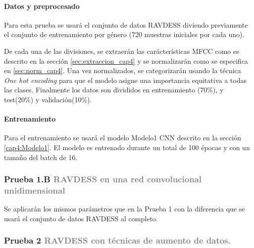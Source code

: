 \documentclass[11pt,a4paper,spanish]{book}
\begin{document}
	\hfill\begin{minipage}{\dimexpr\textwidth-1cm}
		\paragraph{Datos y preprocesado}
		Para esta prueba se usará el conjunto de datos RAVDESS diviendo previamente el conjunto de entrenamiento por género (720 muestras iniciales por cada uno). 
		
		De cada una de las divisiones, se extraerán las carácterísticas MFCC como es descrito en la sección \ref{sec:extraccion_cap4} y se normalizarán como se especifica en \ref{sec:norm_cap4}. Una vez normalizados, se categorizarán usando la técnica \emph{One hot encoding} para que el modelo asigne una importancia equitativa a todas las clases.
		Finalmente los datos son divididos en entrenamiento (70\%), y test(20\%) y validación(10\%).\\
		
		\paragraph{Entrenamiento}
		Para el entrenamiento se usará el modelo Modelo1 CNN descrito en la sección \ref{cap4:Modelo1}. El modelo es entrenado durante un total de 100 épocas y con un tamaño del batch de 16.
	\end{minipage}
	

	\subsubsection[]{\large Prueba 1.B {\normalsize \textcolor{Gray}{RAVDESS en una red convolucional unidimensional}}}
	Se aplicarán los mismos parámetros que en la Prueba 1 con la diferencia que se usará el conjunto de datos RAVDESS al completo.

	\subsubsection{\large Prueba 2  {\normalsize \textcolor{Gray}{RAVDESS con técnicas de aumento de datos.}}}
\end{document}
